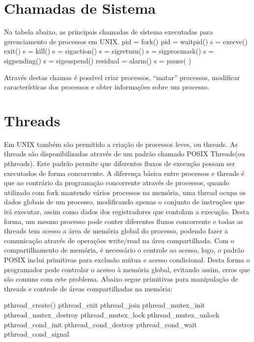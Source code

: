 \section{Chamadas de Sistema}
Na tabela abaixo, as principais chamadas de sistema executadas para gerenciamento de processos em UNIX.
	pid = fork()   
	pid = waitpid()
	s = execve()
	exit()
	s = kill()
	s = sigaction()                    
	s = sigreturn()
	s = sigprocmask()
	s = sigpending()
	s = sigsuspend()               
	residual = alarm()
	s = pause( )

Através destas chamas é possível criar processos, “matar” processos, modificar características dos processos e obter informações sobre um processo.

\section{Threads}
Em UNIX também são permitido a criação de processos leves, ou threads. As threads são disponibilizadas através de um padrão chamado POSIX Threads(ou pthreads). Este padrão permite que diferentes fluxos de execução possam ser executados de forma concorrente. A diferença básica entre processos e threads é que ao contrário da programação concorrente através de processos, quando utilizado com fork mantendo vários processos na memória, uma thread ocupa os dados globais de um processo, modificando apenas o conjunto de instruções que irá executar, assim como dados dos registradores que contolam a execução. Desta forma, um mesmo processo pode conter diferentes fluxos concorrente e todas as threads tem acesso a área de memória global do processo, podendo fazer a comunicação através de operações write/read na área compartilhada. Com o compartilhamento de memória, é necessário o controle ao acesso, logo, o padrão POSIX inclui primitivas para exclusão mútua e acesso condicional. Desta forma o programador pode controlar o acesso à memória global, evitando assim, erros que são comuns com este problema. Abaixo segue primitivas para manipulação de threads e controle de áreas compartilhadas na memória:



	pthread_create()
	pthread_exit
	pthread_join
	pthread_mutex_init
	pthread_mutex_destroy
	pthread_mutex_lock
	pthread_mutex_unlock
	pthread_cond_init
	pthread_cond_destroy
	pthread_cond_wait
	pthread_cond_signal


